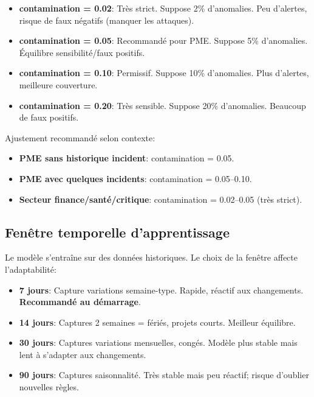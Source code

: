 \begin{itemize}
	\item \textbf{contamination = 0.02}: Très strict. Suppose 2\% d'anomalies. Peu d'alertes, risque de faux négatifs (manquer les attaques).
	
	\item \textbf{contamination = 0.05}: Recommandé pour PME. Suppose 5\% d'anomalies. Équilibre sensibilité/faux positifs.
	
	\item \textbf{contamination = 0.10}: Permissif. Suppose 10\% d'anomalies. Plus d'alertes, meilleure couverture.
	
	\item \textbf{contamination = 0.20}: Très sensible. Suppose 20\% d'anomalies. Beaucoup de faux positifs.
\end{itemize}

Ajustement recommandé selon contexte:
\begin{itemize}
	\item \textbf{PME sans historique incident}: contamination = 0.05.
	\item \textbf{PME avec quelques incidents}: contamination = 0.05–0.10.
	\item \textbf{Secteur finance/santé/critique}: contamination = 0.02–0.05 (très strict).
\end{itemize}

\subsection{Fenêtre temporelle d'apprentissage}

Le modèle s'entraîne sur des données historiques. Le choix de la fenêtre affecte l'adaptabilité:

\begin{itemize}
	\item \textbf{7 jours}: Capture variations semaine-type. Rapide, réactif aux changements. \textbf{Recommandé au démarrage}.
	
	\item \textbf{14 jours}: Captures 2 semaines = fériés, projets courts. Meilleur équilibre.
	
	\item \textbf{30 jours}: Captures variations mensuelles, congés. Modèle plus stable mais lent à s'adapter aux changements.
	
	\item \textbf{90 jours}: Captures saisonnalité. Très stable mais peu réactif; risque d'oublier nouvelles règles.
\end{itemize}

